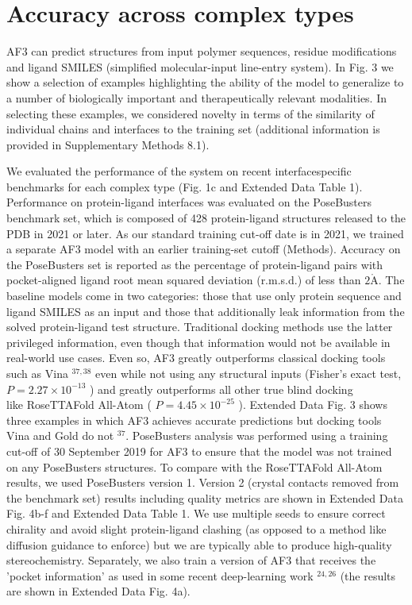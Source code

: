 \documentclass[10pt]{article}
\def\AA{\mathring{\mathrm{A}}}
\begin{document}
\section*{Accuracy across complex types}
AF3 can predict structures from input polymer sequences, residue modifications and ligand SMILES (simplified molecular-input line-entry system). In Fig. 3 we show a selection of examples highlighting the ability of the model to generalize to a number of biologically important and therapeutically relevant modalities. In selecting these examples, we considered novelty in terms of the similarity of individual chains and interfaces to the training set (additional information is provided in Supplementary Methods 8.1).

We evaluated the performance of the system on recent interfacespecific benchmarks for each complex type (Fig. 1c and Extended Data Table 1). Performance on protein-ligand interfaces was evaluated on the PoseBusters benchmark set, which is composed of 428 protein-ligand structures released to the PDB in 2021 or later. As our standard training cut-off date is in 2021, we trained a separate AF3 model with an earlier training-set cutoff (Methods). Accuracy on the PoseBusters set is reported as the percentage of protein-ligand pairs with pocket-aligned ligand root mean squared deviation (r.m.s.d.) of less than $2 \AA$. The baseline models come in two categories: those that use only protein sequence and ligand SMILES as an input and those that additionally leak information from the solved protein-ligand test structure. Traditional docking methods use the latter privileged information, even though that information would not be available in real-world use cases. Even so, AF3 greatly outperforms classical docking tools such as Vina ${ }^{37,38}$ even while not using any structural inputs (Fisher's exact test, $P=2.27 \times 10^{-13}$ ) and greatly outperforms all other true blind docking\\
like RoseTTAFold All-Atom ( $P=4.45 \times 10^{-25}$ ). Extended Data Fig. 3 shows three examples in which AF3 achieves accurate predictions but docking tools Vina and Gold do not ${ }^{37}$. PoseBusters analysis was performed using a training cut-off of 30 September 2019 for AF3 to ensure that the model was not trained on any PoseBusters structures. To compare with the RoseTTAFold All-Atom results, we used PoseBusters version 1. Version 2 (crystal contacts removed from the benchmark set) results including quality metrics are shown in Extended Data Fig. 4b-f and Extended Data Table 1. We use multiple seeds to ensure correct chirality and avoid slight protein-ligand clashing (as opposed to a method like diffusion guidance to enforce) but we are typically able to produce high-quality stereochemistry. Separately, we also train a version of AF3 that receives the 'pocket information' as used in some recent deep-learning work ${ }^{24,26}$ (the results are shown in Extended Data Fig. 4a).\\
\end{document}
